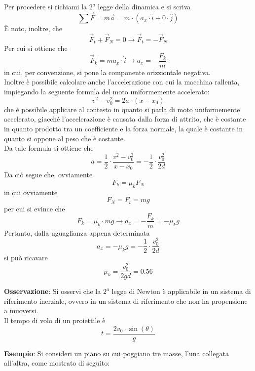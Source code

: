 \documentclass[a4paper]{extarticle}
\begin{document}
\vspace{1em}
\noindent
Per procedere si richiami la $2^a$ legge della dinamica e si scriva
\[\sum \vec{F} = m \vec{a} = m \cdot \left(a_x \cdot \hat{i} + 0 \cdot \hat{j} \right)\]
È noto, inoltre, che
\[\vec{F}_t + \vec{F}_N = 0 \longrightarrow \vec{F}_t = - \vec{F}_N\]
Per cui si ottiene che
\[\vec{F}_k = m a_x \cdot \hat{i} \longrightarrow a_x = -\frac{F_k}{m}\]
in cui, per convenzione, si pone la componente orizziontale negativa.\\
Inoltre è possibile calcolare anche l'accelerazione con cui la macchina rallenta, impiegando la seguente formula del moto uniformemente accelerato:
\[v^2 - v_0^2 = 2a \cdot (x - x_0)\]
che è possibile applicare al contesto in quanto si parla di moto uniformemente accelerato, giacché l'accelerazione è causata dalla forza di attrito, che è costante in quanto prodotto tra un coefficiente e la forza normale, la quale è costante in quanto si oppone al peso che è costante.\\
Da tale formula si ottiene che
\[a = \frac{1}{2} \cdot \frac{v^2-v_0^2}{x-x_0} = -\frac{1}{2} \cdot \frac{v_0^2}{2d}\]
Da ciò segue che, ovviamente
\[F_k = \mu_k F_N\]
in cui ovviamente
\[F_N = F_t = mg\]
per cui si evince che
\[F_k = \mu_k \cdot m g \longrightarrow a_x = - \frac{F_k}{m} = -\mu_k g\]
Pertanto, dalla uguaglianza appena determinata
\[a_x = -\mu_k g = -\frac{1}{2} \cdot \frac{v_0^2}{2d}\]
si può ricavare
\[\mu_k = \frac{v_0^2}{2 g d} = 0.56\]

\vspace{2em}
\noindent
\textbf{Osservazione}: Si osservi che la $2^a$ legge di Newton è applicabile in un sistema di riferimento inerziale, ovvero in un sistema di riferimento che non ha propensione a muoversi.\\
Il tempo di volo di un proiettile è
\[\boxed{t = \frac{2 v_0 \cdot \sin(\theta)}{g}}\]

\vspace{2em}
\noindent
\textbf{Esempio}: Si consideri un piano su cui poggiano tre masse, l'una collegata all'altra, come mostrato di seguito:
\end{document}
